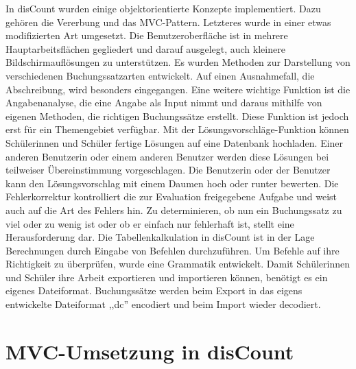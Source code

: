 \documentclass[12pt]{report}
\begin{document}
In disCount wurden einige objektorientierte Konzepte implementiert. Dazu gehören die Vererbung und das MVC-Pattern. Letzteres wurde in einer etwas modifizierten Art umgesetzt. Die Benutzeroberfläche ist in mehrere Hauptarbeitsflächen gegliedert und darauf ausgelegt, auch kleinere Bildschirmauflösungen zu unterstützen. Es wurden Methoden zur Darstellung von verschiedenen Buchungssatzarten entwickelt. Auf einen Ausnahmefall, die Abschreibung, wird besonders eingegangen. Eine weitere wichtige Funktion ist die Angabenanalyse, die eine Angabe als Input nimmt und daraus mithilfe von eigenen Methoden, die richtigen Buchungssätze erstellt. Diese Funktion ist jedoch erst für ein Themengebiet verfügbar. Mit der Lösungsvorschläge-Funktion können Schülerinnen und Schüler fertige Lösungen auf eine Datenbank hochladen. Einer anderen Benutzerin oder einem anderen Benutzer werden diese Lösungen bei teilweiser Übereinstimmung vorgeschlagen. Die Benutzerin oder der Benutzer kann den Lösungsvorschlag mit einem Daumen hoch oder runter bewerten. Die Fehlerkorrektur kontrolliert die zur Evaluation freigegebene Aufgabe und weist auch auf die Art des Fehlers hin. Zu determinieren, ob nun ein Buchungssatz zu viel oder zu wenig ist oder ob er einfach nur fehlerhaft ist, stellt eine Herausforderung dar. Die Tabellenkalkulation in disCount ist in der Lage Berechnungen durch Eingabe von Befehlen durchzuführen. Um Befehle auf ihre Richtigkeit zu überprüfen, wurde eine Grammatik entwickelt. Damit Schülerinnen und Schüler ihre Arbeit exportieren und importieren können, benötigt es ein eigenes Dateiformat. Buchungssätze werden beim Export in das eigens entwickelte Dateiformat ,,dc'' encodiert und beim Import wieder decodiert.





\listoffigures
{}

\newpage
\newpage





\appendix
{}						
\chapter{MVC-Umsetzung in disCount}
\end{document}
